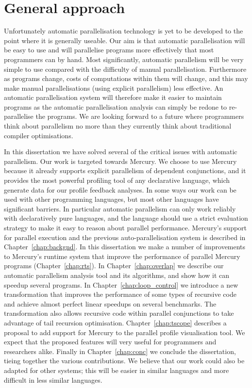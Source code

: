 

\section{General approach}
\label{sec:intro_general_approach}

Unfortunately automatic parallelisation technology is yet to be developed to the
point where it is generally useable.
Our aim is that automatic parallelisation will be easy to use and
will parallelise programs more effectively that most programmers can by
hand.
Most significantly,
automatic parallelism will be very simple to use compared with the
difficulty of manual parallelisation.
Furthermore as programs change,
costs of computations within them will change,
and this may make manual parallelisations (using explicit parallelism) less
effective.
An automatic parallelisation system will therefore make it easier to
maintain programs as the automatic parallelisation analysis can simply be
redone to re-parallelise the programs.
We are looking forward to a future where programmers think about
parallelism no more than they currently think about traditional compiler
optimisations.

In this dissertation we have solved several of the critical issues with
automatic parallelism.
Our work is targeted towards Mercury.
We choose to use Mercury because
it already supports explicit parallelism of dependent conjunctions,
and it provides the most powerful profiling tool of any declarative language,
which generate data for our profile feedback analyses.
In some ways our work can be used with other programming languages,
but most other languages have significant barriers.
In particular automatic parallelism can only work reliably with declaratively
pure languages,
and the language should use a strict evaluation strategy to make it easy to
reason about parallel performance.
Mercury's support for parallel execution and the previous
auto-parallelisation system \citep{bone:2008:hons} is described in
Chapter~\ref{chap:backgnd}.
In this dissertation we make a number of improvements to Mercury's runtime
system that improve the performance of parallel Mercury programs
(Chapter~\ref{chap:rts}).
In Chapter~\ref{chap:overlap} we describe our
automatic parallelism analysis tool and its algorithms,
and show how it can speedup several programs.
In Chapter~\ref{chap:loop_control} we introduce a new transformation that
improves the performance of 
some types of recursive code and achieve almost perfect linear speedups on
several benchmarks.
The transformation also allows recursive code within parallel conjunctions
to take advantage of tail recursion optimisation.
Chapter~\ref{chap:tscope} describes a proposal to add support for Mercury to
the \tscope parallel profile visualisation tool.
We expect that the proposed features will very useful for programmers and
researchers alike.
Finally in Chapter~\ref{chap:conc} we conclude the dissertation,
tieing together the various contributions.
We believe that our work could also be adapted for other systems;
this will be easier in similar languages and more difficult in less similar
languages.

